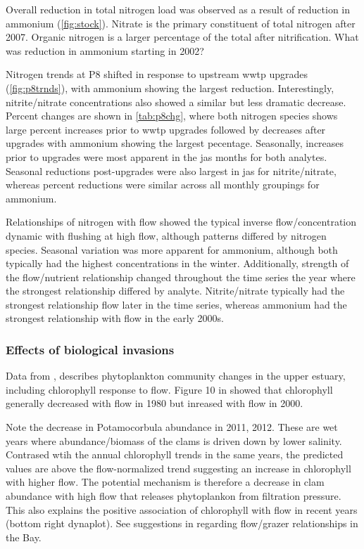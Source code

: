 \documentclass[letterpaper,12pt,oneside]{article}\usepackage[]{graphicx}\usepackage[]{color}
\begin{document}
Overall reduction in total nitrogen load was observed as a result of reduction in ammonium (\cref{fig:stock}).  Nitrate is the primary constituent of total nitrogen after 2007.  Organic nitrogen is a larger percentage of the total after nitrification. What was reduction in ammonium starting in 2002? 

Nitrogen trends at P8 shifted in response to upstream \ac{wwtp} upgrades (\cref{fig:p8trnds}), with ammonium showing the largest reduction.  Interestingly, nitrite/nitrate concentrations also showed a similar but less dramatic decrease.  Percent changes are shown in \cref{tab:p8chg}, where both nitrogen species shows large percent increases prior to \ac{wwtp} upgrades followed by decreases after upgrades with ammonium showing the largest pecentage.  Seasonally, increases prior to upgrades were most apparent in the \ac{jas} months for both analytes.  Seasonal reductions post-upgrades were also largest in \ac{jas} for nitrite/nitrate, whereas percent reductions were similar across all monthly groupings for ammonium.  

Relationships of nitrogen with flow showed the typical inverse flow/concentration dynamic with flushing at high flow, although patterns differed by nitrogen species.  Seasonal variation was more apparent for ammonium, although both typically had the highest concentrations in the winter.  Additionally, strength of the flow/nutrient relationship changed throughout the time series the year where the strongest relationship differed by analyte.  Nitrite/nitrate typically had the strongest relationship flow later in the time series, whereas ammonium had the strongest relationship with flow in the early 2000s.  

\subsubsection{Effects of biological invasions}

Data from \citep{Crauder16}, \citet{Jassby08} describes phytoplankton community changes in the upper estuary, including chlorophyll response to flow.  Figure 10 in \citet{Jassby08} showed that chlorophyll generally decreased with flow in 1980 but inreased with flow in 2000.

Note the decrease in Potamocorbula abundance in 2011, 2012.  These are wet years where abundance/biomass of the clams is driven down by lower salinity.  Contrased wtih the annual chlorophyll trends in the same years, the predicted values are above the flow-normalized trend suggesting an increase in chlorophyll with higher flow.  The potential mechanism is therefore a decrease in clam abundance with high flow that releases phytoplankon from filtration pressure.  This also explains the positive association of chlorophyll with flow in recent years (bottom right dynaplot). See suggestions in \citet{Alpine92} regarding flow/grazer relationships in the Bay. 
\end{document}
